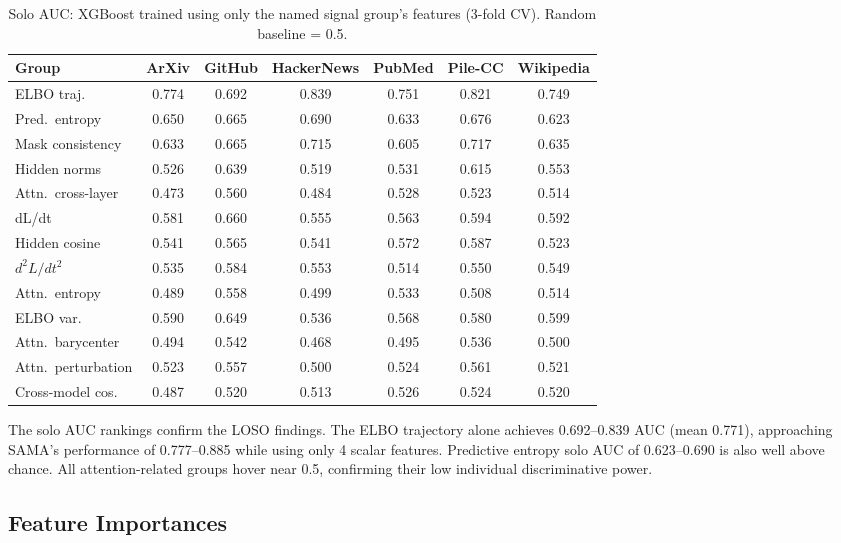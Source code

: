 \documentclass[11pt,a4paper]{article}
\begin{document}
\begin{table}[H]
\centering
\setlength{\tabcolsep}{3.5pt}
\caption{Solo AUC: XGBoost trained using only the named signal group's features (3-fold CV). Random baseline = 0.5.}
\label{tab:solo}
\small
\begin{tabular}{lcccccc}
\toprule
\textbf{Group} & \textbf{ArXiv} & \textbf{GitHub} & \textbf{HackerNews} & \textbf{PubMed} & \textbf{Pile-CC} & \textbf{Wikipedia} \\
\midrule
ELBO traj.          & 0.774 & 0.692 & 0.839 & 0.751 & 0.821 & 0.749 \\
Pred.\ entropy      & 0.650 & 0.665 & 0.690 & 0.633 & 0.676 & 0.623 \\
Mask consistency    & 0.633 & 0.665 & 0.715 & 0.605 & 0.717 & 0.635 \\
Hidden norms        & 0.526 & 0.639 & 0.519 & 0.531 & 0.615 & 0.553 \\
Attn.\ cross-layer  & 0.473 & 0.560 & 0.484 & 0.528 & 0.523 & 0.514 \\
dL/dt               & 0.581 & 0.660 & 0.555 & 0.563 & 0.594 & 0.592 \\
Hidden cosine       & 0.541 & 0.565 & 0.541 & 0.572 & 0.587 & 0.523 \\
$d^2L/dt^2$         & 0.535 & 0.584 & 0.553 & 0.514 & 0.550 & 0.549 \\
Attn.\ entropy      & 0.489 & 0.558 & 0.499 & 0.533 & 0.508 & 0.514 \\
ELBO var.           & 0.590 & 0.649 & 0.536 & 0.568 & 0.580 & 0.599 \\
Attn.\ barycenter   & 0.494 & 0.542 & 0.468 & 0.495 & 0.536 & 0.500 \\
Attn.\ perturbation & 0.523 & 0.557 & 0.500 & 0.524 & 0.561 & 0.521 \\
Cross-model cos.    & 0.487 & 0.520 & 0.513 & 0.526 & 0.524 & 0.520 \\
\bottomrule
\end{tabular}
\end{table}

The solo AUC rankings confirm the LOSO findings. The ELBO trajectory alone
achieves 0.692--0.839 AUC (mean 0.771), approaching SAMA's performance of
0.777--0.885 while using only 4 scalar features. Predictive entropy solo AUC
of 0.623--0.690 is also well above chance. All attention-related groups hover
near 0.5, confirming their low individual discriminative power.

\subsection{Feature Importances}
\label{sec:feature_importance}
\end{document}
